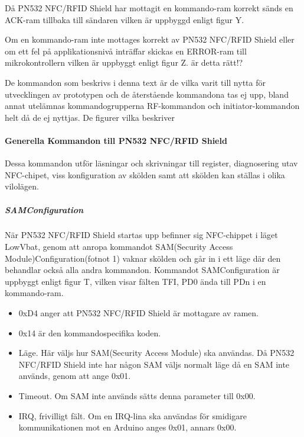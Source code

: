 \documentclass[11pt]{article}
\begin{document}
Då PN532 NFC/RFID Shield har mottagit en kommando-ram korrekt sänds en ACK-ram tillbaka till sändaren vilken är uppbyggd enligt figur Y.


Om en kommando-ram inte mottages korrekt av PN532 NFC/RFID Shield eller om ett fel på applikationsnivå inträffar skickas en ERROR-ram till mikrokontrollern vilken är uppbyggt enligt figur Z. är detta rätt!?


De kommandon som beskrivs i denna text är de vilka varit till nytta för utvecklingen av prototypen och de återstående kommandona tas ej upp, bland annat utelämnas kommandogrupperna RF-kommandon och initiator-kommandon helt då de ej nyttjas. De figurer vilka beskriver 

\paragraph{Generella Kommandon till PN532 NFC/RFID Shield}
Dessa kommandon utför läsningar och skrivningar till register, diagnosering utav NFC-chipet, viss konfiguration av skölden samt att skölden kan ställas i olika vilolägen. 

\subparagraph{SAMConfiguration}
När PN532 NFC/RFID Shield startas upp befinner sig NFC-chippet i läget LowVbat, genom att anropa kommandot SAM(Security Access Module)Configuration(fotnot 1) vaknar skölden och går in i ett läge där den behandlar också alla andra kommandon. Kommandot SAMConfiguration är uppbyggt enligt figur T, vilken visar fälten TFI, PD0 ända till PDn i en kommando-ram. 


\begin{itemize}
\item 0xD4 anger att PN532 NFC/RFID Shield är mottagare av ramen.
\item 0x14 är den kommandospecifika koden.
\item Läge. Här väljs hur SAM(Security Access Module) ska användas. Då PN532 NFC/RFID Shield inte har någon SAM väljs normalt läge då en SAM inte används, genom att ange 0x01.
\item Timeout. Om SAM inte används sätts denna parameter till 0x00.
\item IRQ, frivilligt fält. Om en IRQ-lina ska användas för smidigare kommunikationen mot en Arduino anges 0x01, annars 0x00.
\end{itemize}
\end{document}
